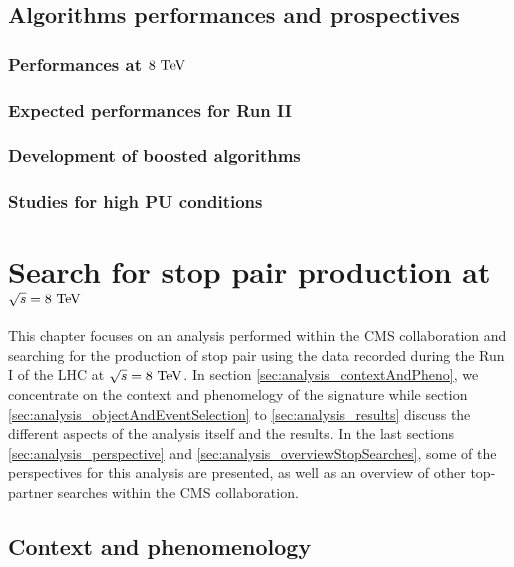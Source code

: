     \section{Algorithms performances and prospectives}
        \loremipsum
        \subsection{Performances at $8~\text{TeV}$}
        \loremipsum
        \subsection{Expected performances for Run II}
        \loremipsum
        \subsection{Development of boosted algorithms}
        \loremipsum
        \subsection{Studies for high PU conditions}
        \loremipsum







\chapter{Search for stop pair production at $\sqrt{s} = 8~\text{TeV}$}

    This chapter focuses on an analysis performed within the CMS collaboration
    and searching for the production of stop pair using the data recorded during
    the Run I of the LHC at $\sqrt{s} = 8~\text{TeV}$. In section \ref{sec:analysis_contextAndPheno},
    we concentrate on the context and phenomelogy of the signature while section
    \ref{sec:analysis_objectAndEventSelection} to \ref{sec:analysis_results} discuss
    the different aspects of the analysis itself and the results. In the last sections
    \ref{sec:analysis_perspective} and \ref{sec:analysis_overviewStopSearches}, some
    of the perspectives for this analysis are presented, as well as an overview of
    other top-partner searches within the CMS collaboration.

    \section{Context and phenomenology \label{sec:analysis_contextAndPheno}}

